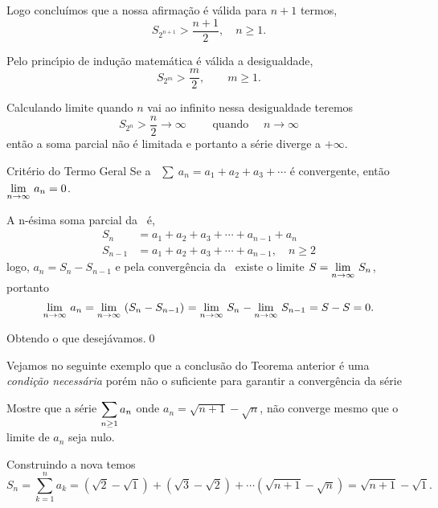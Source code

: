 Logo concluímos que a nossa afirma\c{c}\~{a}o \'{e} v\'{a}lida para $n+1$ termos,
\begin{equation*}
S_{2^{n+1}}>\frac{n+1}{2},\quad n\geq 1.
\end{equation*}

Pelo princ\'{\i}pio de indu\c{c}\~{a}o matem\'{a}tica \'{e} v\'{a}lida  a desigualdade,
\begin{equation*}
S_{2^m}>\frac{m}{2},\qquad m\geq 1.
\end{equation*}


Calculando limite quando $n$ vai ao infinito nessa desigualdade
teremos
\begin{equation*}
S_{2^n}>\frac{n}{2}\to \infty\qquad \text{ quando }\quad
n\to\infty
\end{equation*}
ent\~{a}o a soma parcial n\~{a}o \'{e} limitada e portanto a s\'{e}rie diverge a
$+\infty$.

\begin{theoc}{Critério do Termo Geral}{}
Se a \ser\ $\sum_{}\,a_n=a_1+a_2+a_3+\cdots$ \'{e}
convergente, ent\~{a}o $\displaystyle{\lim_{n\to \infty}\,{a}_{n}}=0$.
\end{theoc}

\prova A n-\'{e}sima soma parcial da \ser\ \'{e},
\begin{align*}
  S_n &=a_1+a_2+a_3+\cdots+a_{n-1}+a_n \\[2ex]
  S_{n-1}&=a_1+a_2+a_3+\cdots+a_{n-1},\quad
  n\ge 2
\end{align*}
logo, $a_n =S_n-S_{n-1}$ e pela converg\^{e}ncia da \ser\ existe o
limite $S=\displaystyle{\lim_{n\to \infty}\,{S_n}_{}}$, portanto
\begin{equation*}
   \displaystyle{\lim_{n\to \infty}\,{a}_{n}}= \displaystyle{\lim_{n\to \infty}\,{(S_n-S_{n-1})}_{}}= \displaystyle{\lim_{n\to \infty}\,{S_n}_{}}- \displaystyle{\lim_{n\to \infty}\,{S_{n-1}}_{}}
   =S-S=0.
\end{equation*}

Obtendo o que desejávamos.\qed

Vejamos no seguinte exemplo que a conclus\~{a}o do Teorema anterior \'{e}
uma \textit{condi\c{c}\~{a}o necess\'{a}ria} por\'{e}m n\~{a}o o suficiente para
garantir a converg\^{e}ncia da s\'{e}rie
\begin{exer}
Mostre que a s\'{e}rie $\displaystyle{\sum_{n\ge 1}a_n}$ onde
$a_n=\sqrt{n+1}-\sqrt{n}$, n\~{a}o converge mesmo que o limite de
$a_n$ seja nulo.
\end{exer}

\solo Construindo a nova \seq temos
\begin{equation*}
    S_n=\sum_{k=1}^na_k=(\sqrt{2}-\sqrt{1})+(\sqrt{3}-\sqrt{2})+\cdots
    (\sqrt{n+1}-\sqrt{n})=\sqrt{n+1}-\sqrt{1}.
\end{equation*}

